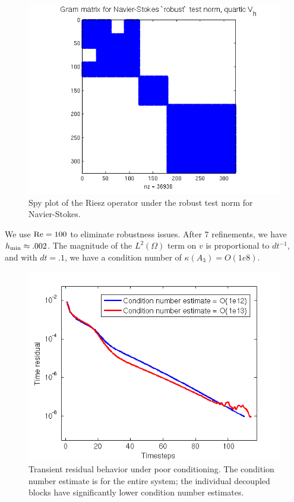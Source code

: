 \documentclass[11pt,onecolumn]{scrartcl}
\newcommand{\LRp}[1]{\left( #1 \right)}
\renewcommand{\L}{L^2\LRp{\Omega}}
\begin{document}
\begin{figure}[!h]
\centering
\includegraphics[scale=.75]{figs/GramMatrixSpy.png}
\caption{Spy plot of the Riesz operator under the robust test norm for Navier-Stokes.}
\end{figure}

We use ${\rm Re} = 100$ to eliminate robustness issues.  After 7 refinements, we have $h_{\rm min} \approx .002$.  The magnitude of the $\L$ term on $v$ is proportional to $dt^{-1}$, and with $dt = .1$, we have a condition number of $\kappa(A_3) = O(1e8)$.  

\begin{figure}[!h]
\centering
\includegraphics[scale=.8]{figs/NSConditionNumbers.png}
\caption{Transient residual behavior under poor conditioning.  The condition number estimate is for the entire system; the individual decoupled blocks have significantly lower condition number estimates.}
\end{figure}
\end{document}
